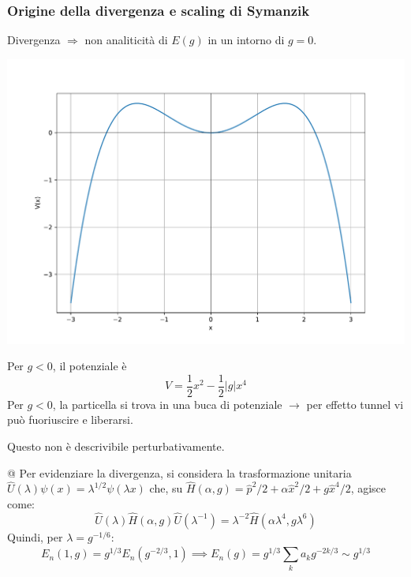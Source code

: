 \documentclass[10pt]{beamer}
\begin{document}
  \begin{frame}
\frametitle{Origine della divergenza e scaling di Symanzik}

Divergenza $\Rightarrow $ non analiticit\`a di $E(g)$ in un intorno di $g=0$. \pause
  \begin{minipage}{0.45\textwidth}
    	\centering
    	\includegraphics[width=\columnwidth]{f1.pdf}
  \end{minipage}%
  \hfill
  \begin{minipage}{0.5\textwidth}
Per $g<0$, il potenziale \`e
\begin{equation*}
	V= \frac{1}{2}x^2 - \frac{1}{2}\lvert g \rvert x^4
\end{equation*}\pause
	  Per $g<0$, la particella si trova in una buca di potenziale $\to$ per effetto tunnel vi pu\`o fuoriuscire e liberarsi.

	  Questo non \`e descrivibile perturbativamente.
  \end{minipage}
\pause
@{\hspace{2cm}}
  Per evidenziare la divergenza, si considera la trasformazione unitaria $\hat{U}(\lambda ) \psi (x) = \lambda ^{1 / 2} \psi (\lambda x)$ che, su $\hat{H}(\alpha ,g) = \hat{p}^2 / 2 + \alpha  \hat{x}^2 / 2 + g \hat{x}^4 / 2$, agisce come:\pause
  \begin{equation*}
  	\hat{U}(\lambda ) \hat{H}(\alpha ,g) \hat{U}(\lambda ^{-1} ) = \lambda ^{-2} \hat{H}(\alpha  \lambda ^4, g \lambda ^6)
  \end{equation*}\pause
  Quindi, per $\lambda  = g^{- 1 / 6} $:\pause
  \[
  E_n(1,g) = g^{1 / 3} E_n(g^{-2 / 3} , 1) \implies E_n(g) = g^{1 /3 }  \sum_{k}^{} a_k g^{-2k/3} \sim g^{1 / 3} 
  \] 
  \end{frame} 
\end{document}
